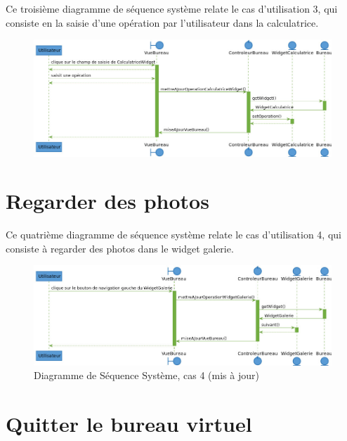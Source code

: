 \section{\color{red}{Saisir une opération (Supprimmé)}}

\color{red}{}Ce troisième diagramme de séquence système relate le cas d'utilisation
3, qui consiste en la saisie d'une opération par l'utilisateur dans la 
calculatrice.\color{black}

\begin{figure}[h!]
	\centering
	\includegraphics[scale=0.4]{diagrammes/dss3.jpg}
	\caption{\color{red}{Diagramme de Séquence Système, cas 3}}
\end{figure}

\section{Regarder des photos}

Ce quatrième diagramme de séquence système relate le cas d'utilisation
4, qui consiste à regarder des photos dans le widget galerie.

\begin{figure}[h!]
	\centering
	\includegraphics[scale=0.48]{diagrammes/dss4.jpg}
	\caption{\color{green}Diagramme de Séquence Système, cas 4 (mis à jour)\color{black}}
\end{figure}
\newpage

\section{Quitter le bureau virtuel}

